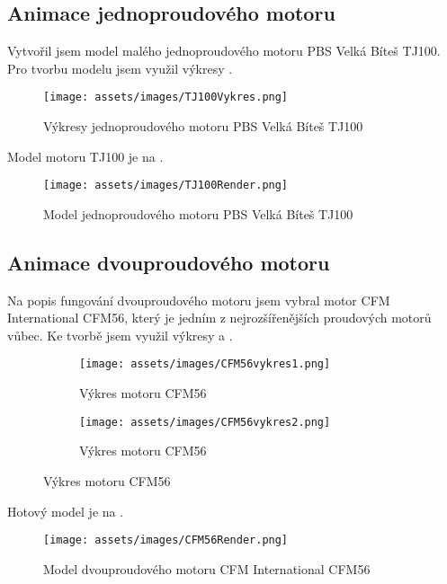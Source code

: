 \subsection{Animace jednoproudového motoru}
{Vytvořil jsem model malého jednoproudového motoru PBS Velká Bíteš TJ100. Pro tvorbu modelu jsem využil výkresy .}
\begin{figure}[H]
    \centering
    \texttt{[image: assets/images/TJ100Vykres.png]}
    \caption{Výkresy jednoproudového motoru PBS Velká Bíteš TJ100 \cite[přeloženo]{PBS:Minijets}}
    \label{obr:PBSTJ100Vykres}
\end{figure}
{Model motoru TJ100 je na .}
\begin{figure}[H]
    \centering
    \texttt{[image: assets/images/TJ100Render.png]}
    \caption{Model jednoproudového motoru PBS Velká Bíteš TJ100 \jaObr}
    \label{obr:TJ100Render}
\end{figure}
\newpage
\subsection{Animace dvouproudového motoru}
{Na popis fungování dvouproudového motoru jsem vybral motor CFM International CFM56, který je jedním z nejrozšířenějších proudových motorů vůbec. Ke tvorbě jsem využil výkresy  a .}
\begin{figure}[H]
    \centering
    \begingroup
    \makeatletter
    \renewcommand\thesubfigure{\thefigure~--~\@nameuse{subfiglabel@\alph{subfigure}}}
    \newcommand{\subfiglabel@a}{vlevo}
    \newcommand{\subfiglabel@b}{vpravo}
    \captionsetup[subfigure]{labelformat=simple, labelsep=colon}
    \renewcommand\p@subfigure{}
    \makeatother
    \begin{subfigure}{.42\textwidth}
        \centering
        \texttt{[image: assets/images/CFM56vykres1.png]}
        \caption{Výkres motoru CFM56 \cite{RG:ReducedOrderModel}}
        \label{obr:CFM56vykres1}
    \end{subfigure}\hfill
    \begin{subfigure}{.55\textwidth}
        \centering
        \texttt{[image: assets/images/CFM56vykres2.png]}
        \caption{Výkres motoru CFM56 \cite[upraveno]{TL:OffDesignPerformancePrediction}}
        \label{obr:CFM56vykres2}
    \end{subfigure}
    \endgroup
\end{figure}
{Hotový model je na .}
\begin{figure}[H]
    \centering
    \texttt{[image: assets/images/CFM56Render.png]}
    \caption{Model dvouproudového motoru CFM International CFM56 \jaObr}
    \label{obr:CFM56Render}
\end{figure}

